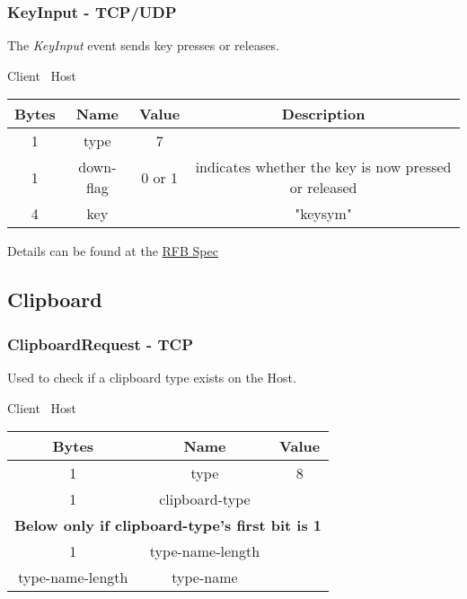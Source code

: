 \subsubsection{KeyInput - TCP/UDP}

The \emph{KeyInput} event sends key presses or releases.

\begin{center}
    Client \textrightarrow\ Host\\
    \begin{tabular}{|c|c|c|c|}
        \hline
        \textbf{Bytes} & \textbf{Name} & \textbf{Value} & \textbf{Description}                                 \\
        \hline
        1              & type          & 7              &                                                      \\
        \hline
        1              & down-flag     & 0 or 1         & indicates whether the key is now pressed or released \\
        \hline
        4              & key           &                & "keysym"                                             \\
        \hline
    \end{tabular}
\end{center}

Details can be found at the \href{https://github.com/rfbproto/rfbproto/blob/master/rfbproto.rst#keyevent}{RFB Spec}

\subsection{Clipboard}

\subsubsection{ClipboardRequest - TCP}

Used to check if a clipboard type exists on the Host.

\begin{center}
    Client \textrightarrow\ Host\\
    \begin{tabular}{|c|c|c|}
        \hline
        \textbf{Bytes}   & \textbf{Name}    & \textbf{Value} \\
        \hline
        1                & type             & 8              \\
        \hline
        1                & clipboard-type   &                \\
        \hline
        \multicolumn{3}{|c|}{\textbf{Below only if clipboard-type's first bit is 1} } \\
        \hline
        1                & type-name-length &                \\
        \hline
        type-name-length & type-name        &                \\
        \hline
    \end{tabular}
\end{center}


